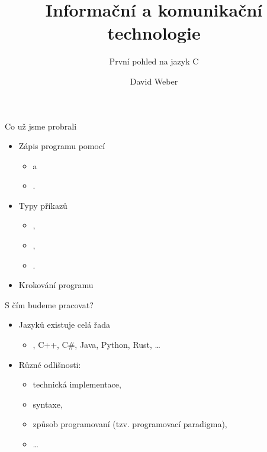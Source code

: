 \documentclass[14pt]{beamer}
\title{Informační a komunikační technologie}
\subtitle{První pohled na jazyk C}
\author{David Weber}
\begin{document}



    \begin{frame}
        \titlepage
    \end{frame}

    \begin{frame}[t]{Co už jsme probrali}
        \begin{itemize}
            \item Zápis programu pomocí
            \begin{itemize}
                \item {} a
                \item {}.
            \end{itemize}
            \item Typy příkazů
            \begin{itemize}
                \item {},
                \item {},
                \item {}.

            \end{itemize}
            \item Krokování programu
        \end{itemize}
        \begin{center}
             
        \end{center}
    \end{frame}

    \begin{frame}[t]{S čím budeme pracovat?}
        \begin{itemize}
            \item Jazyků existuje celá řada
            \begin{itemize}
                \item {}, C++, C\#, Java, Python, Rust, \dots
            \end{itemize}
            \item Různé odlišnosti:
            \begin{itemize}
                \item technická implementace,
                \item syntaxe,
                \item způsob programovaní (tzv. programovací paradigma),
                \item \dots
            \end{itemize}
        \end{itemize}
    \end{frame}
\end{document}
